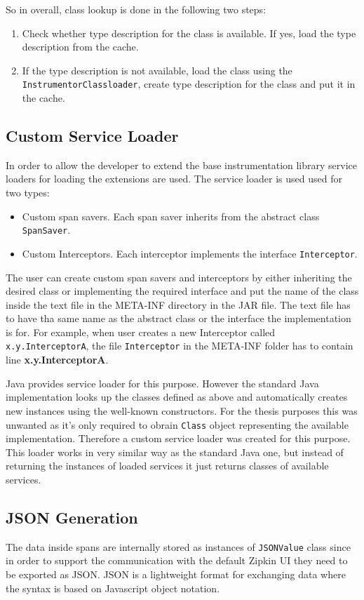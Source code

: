 So in overall, class lookup is done in the following two steps:
\begin{enumerate}
	\item Check whether type description for the class is available. If yes, load the type description from the cache.
	\item If the type description is not available, load the class using the \newline \texttt{InstrumentorClassloader}, create type description for the class and put it in the cache.
\end{enumerate}

\subsection{Custom Service Loader}
In order to allow the developer to extend the base instrumentation library service loaders for loading the extensions are used. The service loader is used used for two types: 
\begin{itemize}
	\item Custom span savers. Each span saver inherits from the abstract class \texttt{SpanSaver}.
	\item Custom Interceptors. Each interceptor implements the interface \texttt{Interceptor}.
\end{itemize} 
The user can create custom span savers and interceptors by either inheriting the desired class or implementing the required interface and put the name of the class inside the text file in the META-INF directory in the JAR file. The text file has to have tha same name as the abstract class or the interface the implementation is for. For example, when user creates a new Interceptor called \texttt{x.y.InterceptorA}, the file \texttt{Interceptor} in the META-INF folder has to contain line \textbf{x.y.InterceptorA}.

Java provides service loader for this purpose. However the standard Java implementation looks up the classes defined as above and automatically creates new instances using the well-known constructors. For the thesis purposes this was unwanted as it's only required to obrain \texttt{Class} object representing the available implementation. Therefore a custom service loader was created for this purpose. This loader works in very similar way as the standard Java one, but instead of returning the instances of loaded services it just returns classes of available services. 

\subsection{JSON Generation}
The data inside spans are internally stored as instances of \texttt{JSONValue} class since in order to support the communication with the default Zipkin UI they need to be exported as JSON. JSON is a lightweight format for exchanging data where the syntax is based on Javascript object notation.

